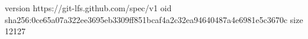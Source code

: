 version https://git-lfs.github.com/spec/v1
oid sha256:0ce65a07a322ee3695eb3309ff851bcaf4a2c32ea94640487a4e6981e5c3670c
size 12127
